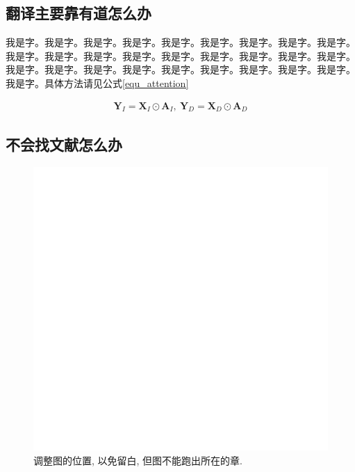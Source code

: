 \documentclass[supercite]{Experimental_Report}
\theoremstyle{definition}
\begin{document}
\subsection{翻译主要靠有道怎么办}

我是字\cite{MU-MIMO2009IEEE}。我是字。我是字。我是字。我是字。我是字。我是字。我是字。我是字。我是字。我是字。我是字。我是字。我是字。我是字。我是字。我是字。我是字。我是字。我是字。我是字。我是字。我是字。我是字。我是字。我是字。我是字。我是字。具体方法请见公式\ref{equ_attention}

\begin{eqnarray}\label{equ_attention}
	\textbf{Y}_I=\textbf{X}_I{\odot}\textbf{A}_I,~\textbf{Y}_D=\textbf{X}_D{\odot}\textbf{A}_D %
\end{eqnarray}

\subsection{不会找文献怎么办}

\begin{figure}[htb]
	\setlength{\abovecaptionskip}{ 0.0cm}
	\setlength{\belowcaptionskip}{-0.5cm}
	\begin{center}
		\includegraphics[scale=0.25]{Fig3-1.pdf}
		\caption{调整图的位置, 以免留白, 但图不能跑出所在的章.}
		\label{fig3-1}
	\end{center}
\end{figure}
\end{document}
